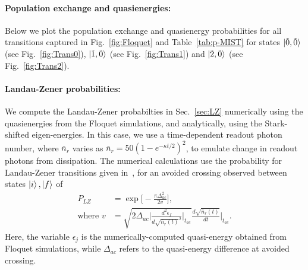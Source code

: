 \documentclass[%
reprint,
superscriptaddress,
 amsmath,amssymb,
 aps,
 prx,
longbibliography,
floatfix,
]{revtex4-2}
\begin{document}
\paragraph{Population exchange and quasienergies:}\label{app:Floquet-trans}
Below we plot the population exchange and quasienergy probabilities for all transitions captured in Fig.~\ref{fig:Floquet} and Table~\ref{tab:p-MIST} for states $\ket{\tilde{0},\tilde{0}}$ (see Fig.~\ref{fig:Trans0}), $\ket{\tilde{1},\tilde{0}}$ (see Fig.~\ref{fig:Trans1}) and $\ket{\tilde{2},\tilde{0}}$ (see Fig.~\ref{fig:Trans2}).

\paragraph{Landau-Zener probabilities:}\label{app:LZ}
We compute the Landau-Zener probabilties in Sec.~\ref{sec:LZ} numerically using the quasienergies from the Floquet simulations, and analytically, using the Stark-shifted eigen-energies. In this case, we use a time-dependent readout photon number, where $\bar n_r$ varies as $\bar n_r=50(1-e^{-\kappa t/2})^2$, to emulate change in readout photons from dissipation. The numerical calculations use the probability for Landau-Zener transitions given in~\cite{ikeda2022floquet}, for an avoided crossing observed between states $\ket{i},\ket{f}$ of
\begin{align}
    P_{LZ}&=\exp{\Big[-\frac{\pi \Delta_{ac}^2}{2v}\Big]},\\
    \text{where } v&=\sqrt{2\Delta_{ac}\Big|\frac{d^2\epsilon_f}{d\sqrt{\bar{n}_r(t)}^2}\Big|_{t_{ac}}}\frac{d\sqrt{\bar{n}_r(t)}}{dt}|_{t_{ac}}\Big .
\end{align}
Here, the variable $\epsilon_j$ is the numerically-computed quasi-energy obtained from Floquet simulations, while $\Delta_{ac}$ refers to the quasi-energy difference at avoided crossing. 
\end{document}
